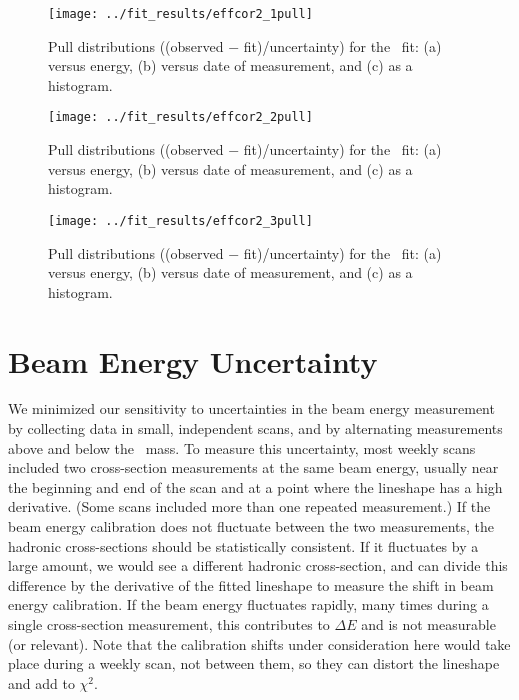\documentclass[aps,prd,preprint,superscriptaddress,tightenlines,nofootinbib,floatfix]{revtex4}
\begin{document}
\begin{figure}[p]
  \texttt{[image: ../fit\_results/effcor2\_1pull]}
  \caption{\label{fig:pull1} Pull distributions ((observed $-$
    fit)/uncertainty) for the \uone\ fit: (a) versus energy, (b)
    versus date of measurement, and (c) as a histogram.}
\end{figure}

\begin{figure}[p]
  \texttt{[image: ../fit\_results/effcor2\_2pull]}
  \caption{\label{fig:pull2} Pull distributions ((observed $-$
    fit)/uncertainty) for the \utwo\ fit: (a) versus energy, (b)
    versus date of measurement, and (c) as a histogram.}
\end{figure}

\begin{figure}[p]
  \texttt{[image: ../fit\_results/effcor2\_3pull]}
  \caption{\label{fig:pull3} Pull distributions ((observed $-$
    fit)/uncertainty) for the \uthree\ fit: (a) versus energy, (b)
    versus date of measurement, and (c) as a histogram.}
\end{figure}

%
\section{Beam Energy Uncertainty}
%

We minimized our sensitivity to uncertainties in the beam energy
measurement by collecting data in small, independent scans, and by
alternating measurements above and below the \ups\ mass.  To measure
this uncertainty, most weekly scans included two cross-section
measurements at the same beam energy, usually near the beginning and
end of the scan and at a point where the lineshape has a high
derivative.  (Some scans included more than one repeated measurement.)
If the beam energy calibration does not fluctuate between the two
measurements, the hadronic cross-sections should be statistically
consistent.  If it fluctuates by a large amount, we would see a
different hadronic cross-section, and can divide this difference by
the derivative of the fitted lineshape to measure the shift in beam
energy calibration.  If the beam energy fluctuates rapidly, many times
during a single cross-section measurement, this contributes to $\Delta
E$ and is not measurable (or relevant).  Note that the calibration
shifts under consideration here would take place during a weekly scan,
not between them, so they can distort the lineshape and add to
$\chi^2$.
\end{document}
